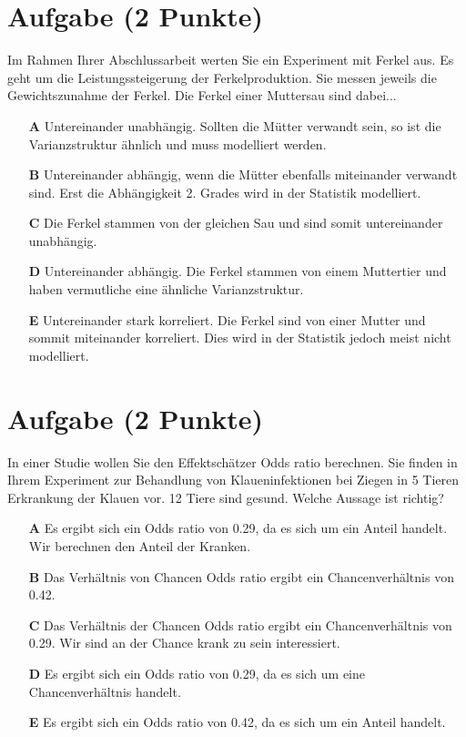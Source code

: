 \documentclass[a4paper, 9pt]{scrartcl}\usepackage[]{graphicx}\usepackage[]{xcolor}
\begin{document}
\section{Aufgabe \hfill (2 Punkte)}



Im Rahmen Ihrer Abschlussarbeit werten Sie ein Experiment mit Ferkel aus. Es geht um die Leistungssteigerung der Ferkelproduktion. Sie messen jeweils die Gewichtszunahme der Ferkel. Die Ferkel einer Muttersau sind dabei...



\begin{enumerate}
\item [\textbf{A} \msquare] Untereinander unabhängig. Sollten die Mütter verwandt sein, so ist die Varianzstruktur ähnlich und muss modelliert werden.
\item [\textbf{B} \msquare] Untereinander abhängig, wenn die Mütter ebenfalls miteinander verwandt sind. Erst die Abhängigkeit 2. Grades wird in der Statistik modelliert.
\item [\textbf{C} \msquare] Die Ferkel stammen von der gleichen Sau und sind somit untereinander unabhängig.
\item [\textbf{D} \msquare] Untereinander abhängig. Die Ferkel stammen von einem Muttertier und haben vermutliche eine ähnliche Varianzstruktur.
\item [\textbf{E} \msquare] Untereinander stark korreliert. Die Ferkel sind von einer Mutter und sommit miteinander korreliert. Dies wird in der Statistik jedoch meist nicht modelliert.
\end{enumerate}

\section{Aufgabe \hfill (2 Punkte)}



In einer Studie wollen Sie den Effektschätzer Odds ratio berechnen. Sie finden in Ihrem Experiment zur Behandlung von Klaueninfektionen bei Ziegen in 5 Tieren Erkrankung der Klauen vor. 12 Tiere sind gesund. Welche Aussage ist richtig?



\begin{enumerate}
\item [\textbf{A} \msquare] Es ergibt sich ein Odds ratio von 0.29, da es sich um ein Anteil handelt. Wir berechnen den Anteil der Kranken.
\item [\textbf{B} \msquare] Das Verhältnis von Chancen Odds ratio ergibt ein Chancenverhältnis von 0.42.
\item [\textbf{C} \msquare] Das Verhältnis der Chancen Odds ratio ergibt ein Chancenverhältnis von 0.29. Wir sind an der Chance krank zu sein interessiert.
\item [\textbf{D} \msquare] Es ergibt sich ein Odds ratio von 0.29, da es sich um eine Chancenverhältnis handelt.
\item [\textbf{E} \msquare] Es ergibt sich ein Odds ratio von 0.42, da es sich um ein Anteil handelt.
\end{enumerate}
\end{document}
